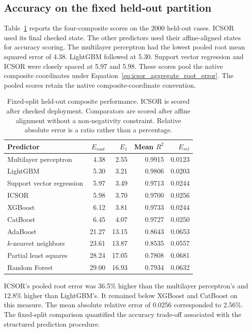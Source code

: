 \subsection{Accuracy on the fixed held-out partition}

Table~\ref{tab:icsor_fixed_results} reports the four-composite scores on the 2000 held-out cases. ICSOR used its final checked state. The other predictors used their affine-aligned states for accuracy scoring. The multilayer perceptron had the lowest pooled root mean squared error of 4.38. LightGBM followed at 5.30. Support vector regression and ICSOR were closely spaced at 5.97 and 5.98. These scores pool the native composite coordinates under Equation~\eqref{eq:icsor_aggregate_root_error}. The pooled scores retain the native composite-coordinate convention.

\begin{table}[htbp]
\centering\small
\caption{Fixed-split held-out composite performance. ICSOR is scored after checked deployment. Comparators are scored after affine alignment without a non-negativity constraint. Relative absolute error is a ratio rather than a percentage.}
\label{tab:icsor_fixed_results}
\begin{tabular}{p{4.7cm}rrrr}
\toprule
Predictor & $E_{root}$ & $E_1$ & Mean $R^2$ & $E_{rel}$\\
\midrule
Multilayer perceptron & 4.38 & 2.55 & 0.9915 & 0.0123\\
LightGBM & 5.30 & 3.21 & 0.9806 & 0.0203\\
Support vector regression & 5.97 & 3.49 & 0.9713 & 0.0244\\
ICSOR & 5.98 & 3.70 & 0.9700 & 0.0256\\
XGBoost & 6.12 & 3.81 & 0.9733 & 0.0244\\
CatBoost & 6.45 & 4.07 & 0.9727 & 0.0250\\
AdaBoost & 21.27 & 13.15 & 0.8643 & 0.0653\\
$k$-nearest neighbors & 23.61 & 13.87 & 0.8535 & 0.0557\\
Partial least squares & 28.24 & 17.05 & 0.7808 & 0.0681\\
Random Forest & 29.00 & 16.93 & 0.7934 & 0.0632\\
\bottomrule
\end{tabular}
\end{table}

ICSOR's pooled root error was 36.5\% higher than the multilayer perceptron's and 12.8\% higher than LightGBM's. It remained below XGBoost and CatBoost on this measure. The mean absolute relative error of 0.0256 corresponded to 2.56\%. The fixed-split comparison quantified the accuracy trade-off associated with the structured prediction procedure.

